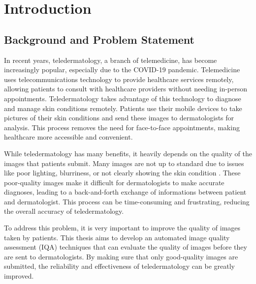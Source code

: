 \chapter{Introduction}
\label{ch:Introduction}

\section{Background and Problem Statement}
\label{sec:BackgroundProblemStatement}
In recent years, teledermatology, a branch of telemedicine, has become increasingly popular, especially due to the COVID-19 pandemic. Telemedicine uses telecommunications technology to provide healthcare services remotely, allowing patients to consult with healthcare providers without needing in-person appointments. Teledermatology takes advantage of this technology to diagnose and manage skin conditions remotely. Patients use their mobile devices to take pictures of their skin conditions and send these images to dermatologists for analysis. This process removes the need for face-to-face appointments, making healthcare more accessible and convenient. \par
\vspace{\baselineskip}
\noindent
While teledermatology has many benefits, it heavily depends on the quality of the images that patients submit. Many images are not up to standard due to issues like poor lighting, blurriness, or not clearly showing the skin condition \autocite{TrueImage}. These poor-quality images make it difficult for dermatologists to make accurate diagnoses, leading to a back-and-forth exchange of informations between patient and dermatologist. This process can be time-consuming and frustrating, reducing the overall accuracy of teledermatology. \par
\vspace{\baselineskip}
\noindent
To address this problem, it is very important to improve the quality of images taken by patients. This thesis aims to develop an automated image quality assessment (IQA) techniques that can evaluate the quality of images before they are sent to dermatologists. By making sure that only good-quality images are submitted, the reliability and effectiveness of teledermatology can be greatly improved. \par 
\clearpage
